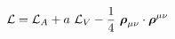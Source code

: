 \begin{equation}
{\cal{L}}={\cal{L}}_A + a~{\cal{L}}_V -\frac{1}{4}~ \mbox{\boldmath$\rho$}_{\mu\nu}\cdot \mbox{\boldmath$\rho$}^{\mu\nu}
\end{equation}

